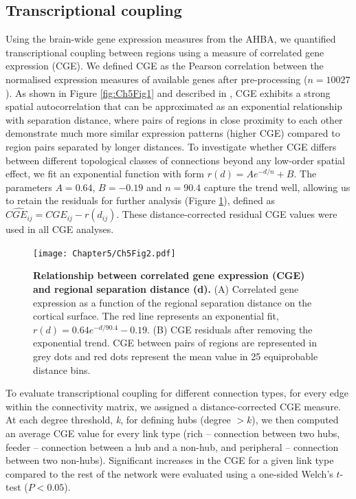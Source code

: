\subsection{Transcriptional coupling}
\label{sec:CGE}

Using the brain-wide gene expression measures from the AHBA, we quantified transcriptional coupling between regions using a measure of correlated gene expression (CGE). We defined CGE as the Pearson correlation between the normalised expression measures of available genes after pre-processing ($n=\num{10027}$). As shown in Figure \ref{fig:Ch5Fig1} and described in \citep{Arnatkeviciute2019}, CGE exhibits a strong spatial autocorrelation that can be approximated as an exponential relationship with separation distance, where pairs of regions in close proximity to each other demonstrate much more similar expression patterns (higher CGE) compared to region pairs separated by longer distances. To investigate whether CGE differs between different topological classes of connections beyond any low-order spatial effect, we fit an exponential function with form $r(d)=Ae^{-d/n}+B$. The parameters $A = 0.64$, $B = -0.19$ and $n=90.4$ capture the trend well, allowing us to retain the residuals for further analysis (Figure \ref{fig:Ch5Fig2}), defined as $\widehat{CGE_{ij}}=CGE_{ij} - r(d_{ij})$. These distance-corrected residual CGE values were used in all CGE analyses.

\begin{figure}[h!]
\begin{center}
\texttt{[image: Chapter5/Ch5Fig2.pdf]}%
\end{center}
\caption{\textbf{Relationship between correlated gene expression (CGE) and regional separation distance (d).}
(A) Correlated gene expression as a function of the regional separation distance on the cortical surface. The red line represents an exponential fit, $r(d)=0.64e^{-d/90.4}-0.19$.
(B) CGE residuals after removing the exponential trend. CGE between pairs of regions are represented in grey dots and red dots represent the mean value in 25 equiprobable distance bins.}
\label{fig:Ch5Fig2}
\end{figure}

To evaluate transcriptional coupling for different connection types, for every edge within the connectivity matrix, we assigned a distance-corrected CGE measure. At each degree threshold, \textit{k}, for defining hubs (degree $>k$), we then computed an average CGE value for every link type (rich -- connection between two hubs, feeder -- connection between a hub and a non-hub, and peripheral -- connection between two non-hubs). Significant increases in the CGE for a given link type compared to the rest of the network were evaluated using a one-sided Welch's $t$-test ($P<0.05$).


